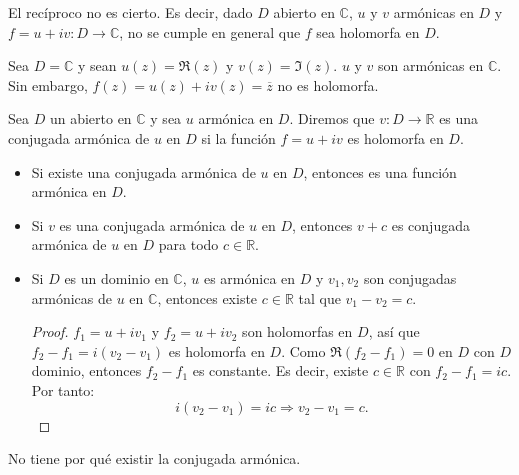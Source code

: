 El recíproco no es cierto.
Es decir, dado $D$ abierto en $\mathbb{C}$, $u$ y $v$ armónicas en $D$ y $f = u + iv: D \to \mathbb{C}$, no se cumple en general que $f$ sea holomorfa en $D$.

\begin{example}[Contraejemplo]
    Sea $D = \mathbb{C}$ y sean $u(z) = \Re(z)$ y $v(z) = \Im(z)$.
    $u$ y $v$ son armónicas en $\mathbb{C}$.
    Sin embargo, $f(z) = u(z) + iv(z) = \overline{z}$ no es holomorfa.
\end{example}

\begin{definition}
    Sea $D$ un abierto en $\mathbb{C}$ y sea $u$ armónica en $D$.
    Diremos que $v: D \to \mathbb{R}$ es una conjugada armónica de $u$ en $D$ si la función $f = u + iv$ es holomorfa en $D$.
\end{definition}

\begin{properties}
    \hfill
    \begin{itemize}
        \item Si existe una conjugada armónica de $u$ en $D$, entonces es una función armónica en $D$.
        \item Si $v$ es una conjugada armónica de $u$ en $D$, entonces $v + c$ es conjugada armónica de $u$ en $D$ para todo $c \in \mathbb{R}$.
        \item Si $D$ es un dominio en $\mathbb{C}$, $u$ es armónica en $D$ y $v_1, v_2$ son conjugadas armónicas de $u$ en $\mathbb{C}$, entonces existe $c \in \mathbb{R}$ tal que $v_1-v_2 = c$.
              \begin{proof}
                  $f_1 = u + iv_1$ y $f_2 = u + iv_2$ son holomorfas en $D$, así que $f_2 - f_1 = i(v_2-v_1)$ es holomorfa en $D$.
                  Como $\Re(f_2-f_1) = 0$ en $D$ con $D$ dominio, entonces $f_2 - f_1$ es constante.
                  Es decir, existe $c \in \mathbb{R}$ con $f_2-f_1 = ic$.
                  Por tanto:
                  $$i(v_2-v_1) = ic \Rightarrow v_2 - v_1 = c.$$
              \end{proof}
    \end{itemize}
\end{properties}

No tiene por qué existir la conjugada armónica.

